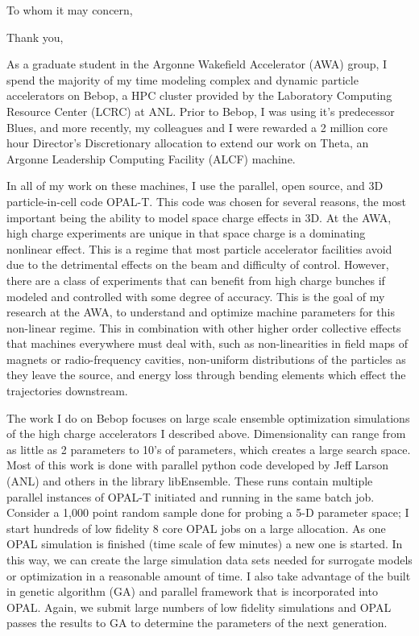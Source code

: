 \documentclass[11pt,a4paper,sans]{moderncv}        %
\begin{document}
\date{March 15, 2018}
\opening{To whom it may concern,}
\closing{Thank you,}

\makelettertitle

As a graduate student in the Argonne Wakefield Accelerator (AWA) group, 
I spend the majority of my time modeling complex and dynamic particle accelerators on 
Bebop, a HPC cluster provided by the Laboratory Computing Resource Center (LCRC) at ANL. 
Prior to Bebop, I was using it's predecessor Blues, and more recently, 
my colleagues and I were rewarded a 2 million core hour Director's Discretionary 
allocation to extend our work on Theta, 
an Argonne Leadership Computing Facility (ALCF) machine. 

In all of my work on these machines, I use the parallel, open source, and 
3D particle-in-cell code OPAL-T. 
This code was chosen for several reasons, the most important being the ability 
to model space charge effects in 3D. At the AWA, high charge experiments are unique
in that space charge is a dominating nonlinear effect. This is a regime that most 
particle accelerator facilities avoid due to the detrimental effects on the beam 
and difficulty of control.
However, there are a class of experiments that can benefit from high charge bunches 
if modeled and controlled with some degree of accuracy. This is the goal of my research
at the AWA, to understand and optimize machine parameters for 
this non-linear regime. This in combination with other higher order collective 
effects that machines everywhere must deal with, such as non-linearities in field maps of 
magnets or radio-frequency cavities, non-uniform distributions of the particles as they 
leave the source, and energy loss through bending elements which effect the trajectories downstream. 

The work I do on Bebop focuses on large scale ensemble optimization simulations
of the high charge accelerators I described above. 
Dimensionality can range from as little as 2 parameters 
to 10's of parameters, which creates a large search space. Most of this work is done 
with parallel python code developed by Jeff Larson (ANL) 
and others in the library libEnsemble. These runs contain multiple parallel instances of OPAL-T initiated and running in the same batch job. Consider a 1,000 point random sample done for probing a 5-D parameter space; I start hundreds of low fidelity 8 core OPAL jobs on a large allocation.
As one OPAL simulation is finished (time scale of few minutes) a new one is started.
In this way, we can create the large simulation data sets needed for surrogate models or optimization in a reasonable amount of time. I also take advantage of the 
built in genetic algorithm (GA) and parallel framework that is incorporated into OPAL.
Again, we submit large numbers of low fidelity simulations and OPAL passes the 
results to GA to determine the parameters of the next generation. 
\end{document}
